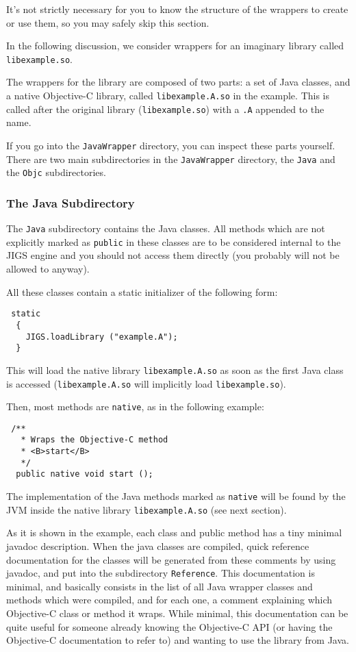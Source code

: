 It's not strictly necessary for you to know the structure of the
wrappers to create or use them, so you may safely skip this section.

In the following discussion, we consider wrappers for an imaginary
library called \texttt{libexample.so}.

The wrappers for the library are composed of two parts: a set of Java
classes, and a native Objective-C library, called
\texttt{libexample.A.so} in the example.  This is called after the 
original library (\texttt{libexample.so}) with a \texttt{.A} appended
to the name.

If you go into the \texttt{JavaWrapper} directory, you can inspect
these parts yourself.  There are two main subdirectories in the
\texttt{JavaWrapper} directory, the \texttt{Java} and the
\texttt{Objc} subdirectories.

\subsubsection{The Java Subdirectory}

The \texttt{Java} subdirectory contains the Java classes.  All methods
which are not explicitly marked as \texttt{public} in these classes
are to be considered internal to the JIGS engine and you should not
access them directly (you probably will not be allowed to anyway).

All these classes contain a static initializer of the following form:
\begin{verbatim}
 static
  {
    JIGS.loadLibrary ("example.A");
  }
\end{verbatim}
This will load the native library \texttt{libexample.A.so} as soon as
the first Java class is accessed (\texttt{libexample.A.so} will
implicitly load \texttt{libexample.so}).

Then, most methods are \texttt{native}, as in the following example: 
\begin{verbatim}
 /**
   * Wraps the Objective-C method
   * <B>start</B>
   */
  public native void start ();
\end{verbatim}

The implementation of the Java methods marked as \texttt{native} will
be found by the JVM inside the native library \texttt{libexample.A.so}
(see next section).

As it is shown in the example, each class and public method has a tiny
minimal javadoc description.  When the java classes are compiled,
quick reference documentation for the classes will be generated from
these comments by using javadoc, and put into the subdirectory
\texttt{Reference}.  This documentation is minimal, and basically
consists in the list of all Java wrapper classes and methods which
were compiled, and for each one, a comment explaining which
Objective-C class or method it wraps.  While minimal, this
documentation can be quite useful for someone already knowing the
Objective-C API (or having the Objective-C documentation to refer to)
and wanting to use the library from Java.

